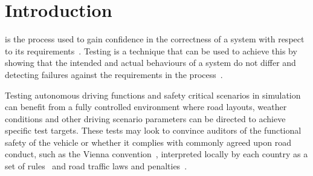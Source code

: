 \documentclass[letterpaper, 10 pt, journal, twoside]{IEEEtran}
\begin{document}
\section{Introduction}

 is the process used to gain confidence in the correctness of a system with respect to its requirements~\cite{bergeron2012writing}. Testing is a technique that can be used to achieve this by showing that the intended and actual behaviours of a system do not differ and detecting failures against the requirements in the process~\cite{utting2012taxonomy}.




Testing autonomous driving functions and safety critical scenarios in simulation can benefit from a fully controlled environment where road layouts, weather conditions and other %
driving scenario parameters 
can be directed to achieve specific test targets. %
%
%
These tests may look to convince auditors of the functional safety of the vehicle or whether it complies with commonly agreed upon road conduct, such as the Vienna convention~\cite{ViennaConv}, interpreted locally by each country as a set of rules~\cite{codes2011highway} and road traffic laws and penalties~\cite{RoadTraffic1988}.
%
\end{document}
